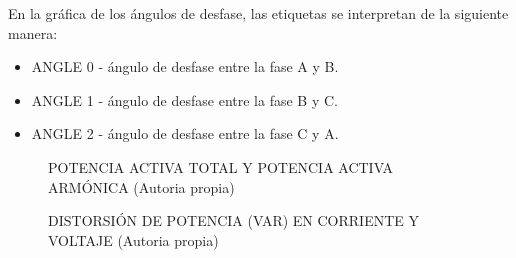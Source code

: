     En la gráfica de los ángulos de desfase, las etiquetas se interpretan de la siguiente manera:
    \begin{itemize}
      \itemsep0em
      \item ANGLE 0 - ángulo de desfase entre la fase A y B.
      \item ANGLE 1 - ángulo de desfase entre la fase B y C.
      \item ANGLE 2 - ángulo de desfase entre la fase C y A.
    \end{itemize}
    \begin{figure}[H]
      \hfill
      \hfill
      \hfill
      \caption{POTENCIA ACTIVA TOTAL Y POTENCIA ACTIVA ARMÓNICA (Autoria propia)}
      \end{figure}
    \begin{figure}[H]
      \hfill
      \hfill
      \hfill
      \caption{DISTORSIÓN DE POTENCIA (VAR) EN CORRIENTE Y VOLTAJE (Autoria propia)}
      \end{figure}
